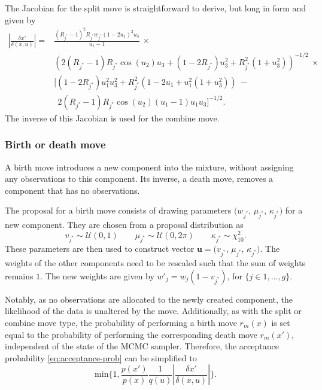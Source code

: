 The Jacobian for the split move is straightforward to derive, but long in form and given by
\begin{align*}
\left| \frac{\delta x'}{\delta (x, u)} \right| =
&\frac{(R_{j^*}-1)^2 R_{j^*} w_{j^*} (1-2 u_1)^2 u_3}{u_1-1} ~\times \\
&\left(2 (R_{j^*}-1) R_{j^*} \cos(u_2) u_3 + (1 - 2 R_{j^*}) u_3^2 + R_{j^*}^2 (1 + u_3^2)\right)^{-1/2} ~\times\\
&\big[ (1 - 2 R_{j^*}) u_1^2 u_3^2 + R_{j^*}^2 (1-2 u_1 + u_1^2 (1+u_3^2)) ~ - \\ &~~ 2 (R_{j^*}-1) R_{j^*} \cos(u_2) (u_1-1) u_1 u_3\big]^{-1/2}.
\end{align*}
The inverse of this Jacobian is used for the combine move. 



\subsubsection{Birth or death move}
A birth move introduces a new component into the mixture, without assigning any observations to this component. Its inverse, a death move, removes a component that has no observations.

The proposal for a birth move consists of drawing parameters $(w_{j^*}$, $\mu_{j^*}$, $\kappa_{j^*})$ for a new component. They are chosen from a proposal distribution as
\begin{equation}
v_{j^*} \sim \mathcal{U}(0, 1) \qquad \mu_{j^*} \sim \mathcal{U}(0, 2\pi) \qquad \kappa_{j^*} \sim \chi^2_{10}.
\end{equation}
These parameters are then used to construct vector $\bm u = (v_{j^*}$, $\mu_{j^*}$, $\kappa_{j^*})$. The weights of the other components need to be rescaled such that the sum of weights remains $1$. The new weights are given by $w'_{j} = w_j(1-v_{j^*})$, for $\{ j \in 1, \dotsc, g \}$.

Notably, as no observations are allocated to the newly created component, the likelihood of the data is unaltered by the move. Additionally, as with the split or combine move type, the probability of performing a birth move $r_m(x)$ is set equal to the probability of performing the corresponding death move $r_m(x')$, independent of the state of the MCMC sampler. Therefore, the acceptance probability \eqref{eq:acceptance-prob} can be simplified to
\begin{equation}
\text{min} \bigg \{ 1, \frac{p(x')}{p(x)} \frac{1}{q(u)} \left| \frac{\delta x'}{\delta (x, u)} \right| \bigg \}.
\end{equation}

